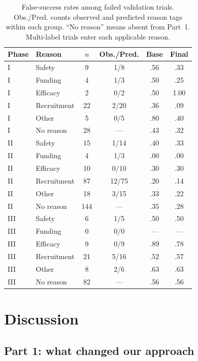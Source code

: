 \documentclass[10pt,twocolumn,letterpaper]{article}
\begin{document}
\begin{table}[t]
\centering\small
\setlength{\tabcolsep}{2.5pt}
\begin{tabular*}{\columnwidth}{@{\extracolsep{\fill}}llcccc@{}}
\toprule
Phase & Reason & $n$ & Obs./Pred. & Base & Final \\
\midrule
I & Safety & 9 & 1/8 & .56 & .33 \\
I & Funding & 4 & 1/3 & .50 & .25 \\
I & Efficacy & 2 & 0/2 & .50 & 1.00 \\
I & Recruitment & 22 & 2/20 & .36 & .09 \\
I & Other & 5 & 0/5 & .80 & .40 \\
I & No reason & 28 & --- & .43 & .32 \\
II & Safety & 15 & 1/14 & .40 & .33 \\
II & Funding & 4 & 1/3 & .00 & .00 \\
II & Efficacy & 10 & 0/10 & .30 & .30 \\
II & Recruitment & 87 & 12/75 & .20 & .14 \\
II & Other & 18 & 3/15 & .33 & .22 \\
II & No reason & 144 & --- & .35 & .28 \\
III & Safety & 6 & 1/5 & .50 & .50 \\
III & Funding & 0 & 0/0 & --- & --- \\
III & Efficacy & 9 & 0/9 & .89 & .78 \\
III & Recruitment & 21 & 5/16 & .52 & .57 \\
III & Other & 8 & 2/6 & .63 & .63 \\
III & No reason & 82 & --- & .56 & .56 \\
\bottomrule
\end{tabular*}
\caption{False-success rates among failed validation trials. Obs./Pred.
counts observed and predicted reason tags within each group. ``No reason''
means absent from Part~1. Multi-label trials enter each applicable reason.}
\label{tab:err}
\end{table}

\section{Discussion}
\label{sec:why}

\subsection{Part 1: what changed our approach}
\end{document}
